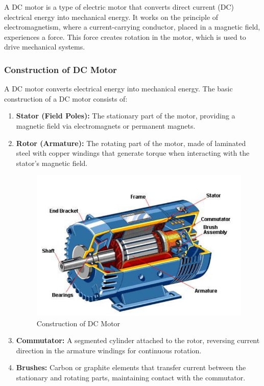 \documentclass[a4paper,12pt]{article}
\begin{document}
	
	A DC motor is a type of electric motor that converts direct current (DC) electrical energy into mechanical energy. It works on the principle of electromagnetism, where a current-carrying conductor, placed in a magnetic field, experiences a force. This force creates rotation in the motor, which is used to drive mechanical systems.\\
	\subsubsection{Construction of DC Motor}
	A DC motor converts electrical energy into mechanical energy. The basic construction of a DC motor consists of:
	\begin{enumerate}\item \textbf{Stator (Field Poles):}  
		The stationary part of the motor, providing a magnetic field via electromagnets or permanent magnets.
		
		\item \textbf{Rotor (Armature):}  
		The rotating part of the motor, made of laminated steel with copper windings that generate torque when interacting with the stator’s magnetic field.
		
		\begin{figure}[h]
			\centering
			\includegraphics[width=0.6\linewidth]{"Images/DC MOTOR"}
			\caption[Construction of DC Motor]{Construction of DC Motor}
			\label{fig:dc-motor}
		\end{figure}
		
		\item \textbf{Commutator:}  
		A segmented cylinder attached to the rotor, reversing current direction in the armature windings for continuous rotation.
		
		\item \textbf{Brushes:}  
		Carbon or graphite elements that transfer current between the stationary and rotating parts, maintaining contact with the commutator.
		

\end{enumerate}
\end{document}
